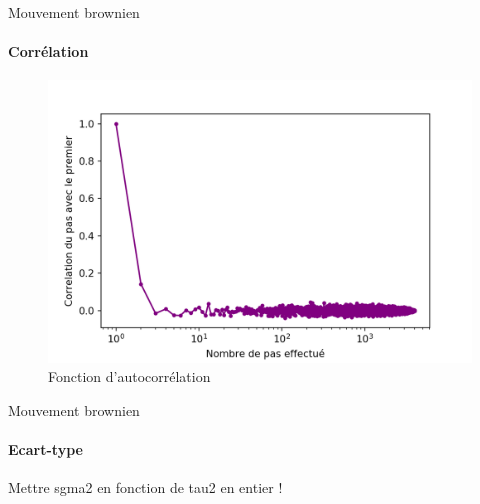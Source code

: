 \documentclass[11pt]{beamer}
\begin{document}
\begin{frame}{Mouvement brownien}
\framesubtitle{Corrélation}
	\begin{figure}
		\centering
		\includegraphics[width=0.9\linewidth]{Correlation_brownian}
		\caption{Fonction d'autocorrélation}
		\label{fig:correl_b}
	\end{figure}
\end{frame}



\begin{frame}{Mouvement brownien}
\framesubtitle{Ecart-type}

Mettre sgma2 en fonction de tau2 en entier ! 

\end{frame}
\end{document}
